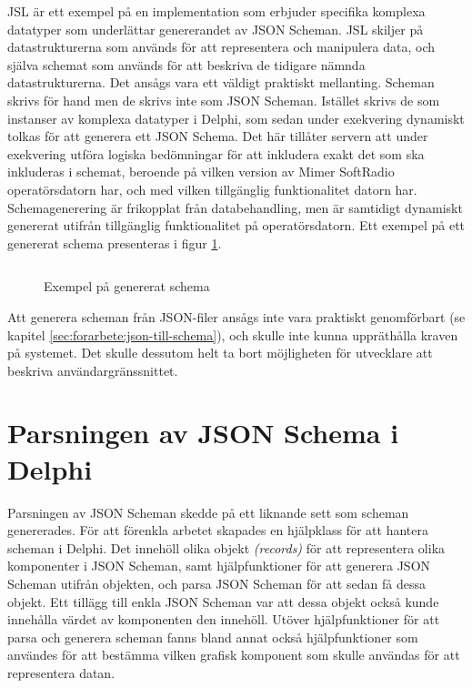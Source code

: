 JSL är ett exempel på en implementation som erbjuder specifika komplexa datatyper som underlättar genererandet av JSON Scheman. JSL skiljer på datastrukturerna som används för att representera och manipulera data, och själva schemat som används för att beskriva de tidigare nämnda datastrukturerna. \cite{Romanovich} Det ansågs vara ett väldigt praktiskt mellanting. Scheman skrivs för hand men de skrivs inte som JSON Scheman. Istället skrivs de som instanser av komplexa datatyper i Delphi, som sedan under exekvering dynamiskt tolkas för att generera ett JSON Schema. Det här tillåter servern att under exekvering utföra logiska bedömningar för att inkludera exakt det som ska inkluderas i schemat, beroende på vilken version av Mimer SoftRadio operatörsdatorn har, och med vilken tillgänglig funktionalitet datorn har. Schemagenerering är frikopplat från databehandling, men är samtidigt dynamiskt genererat utifrån tillgänglig funktionalitet på operatörsdatorn. Ett exempel på ett genererat schema presenteras i figur \ref{fig:real-schema}.

\begin{figure}
	\inputminted[tabsize=2, frame=single, fontsize=\small, framesep=2mm, breaklines]{json}{code/schema.json}
	\vspace{-1.7em}
	\caption{Exempel på genererat schema}
	\label{fig:real-schema}
\end{figure}

Att generera scheman från JSON-filer ansågs inte vara praktiskt genomförbart (se kapitel \ref{sec:forarbete:json-till-schema}), och skulle inte kunna uppräthålla kraven på systemet. Det skulle dessutom helt ta bort möjligheten för utvecklare att beskriva användargränssnittet.

\section{Parsningen av JSON Schema i Delphi}
\label{sec:arbetet:parsning}

Parsningen av JSON Scheman skedde på ett liknande sett som scheman genererades. För att förenkla arbetet skapades en hjälpklass för att hantera scheman i Delphi. Det innehöll olika objekt \textit{(records)} för att representera olika komponenter i JSON Scheman, samt hjälpfunktioner för att generera JSON Scheman utifrån objekten, och parsa JSON Scheman för att sedan få dessa objekt. Ett tillägg till enkla JSON Scheman var att dessa objekt också kunde innehålla värdet av komponenten den innehöll. Utöver hjälpfunktioner för att parsa och generera scheman fanns bland annat också hjälpfunktioner som användes för att bestämma vilken grafisk komponent som skulle användas för att representera datan.

